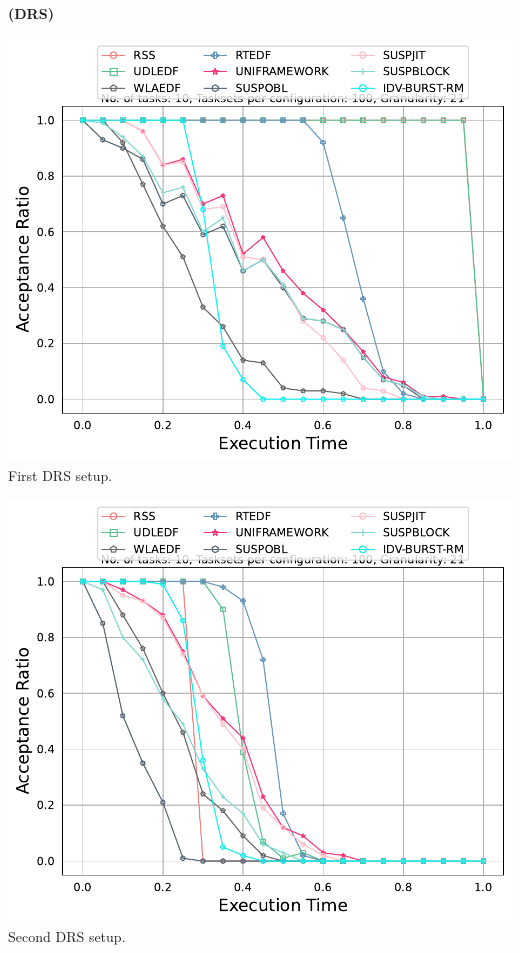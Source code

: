 \documentclass[]{article}
\begin{document}
	\begin{minipage}[t]{0.48\linewidth}
		\centering
		\textbf{(DRS)}
		\vspace{0.3cm}
		
		\includegraphics[width=\linewidth]{comaprison_1stSetup_DRS.pdf}
		First DRS setup.
		\vspace{0.3cm}
		
		\includegraphics[width=\linewidth]{comaprison_2ndSetup_DRS.pdf}
		Second DRS setup.
		\vspace{0.3cm}

                   

	\end{minipage}
\end{document}
